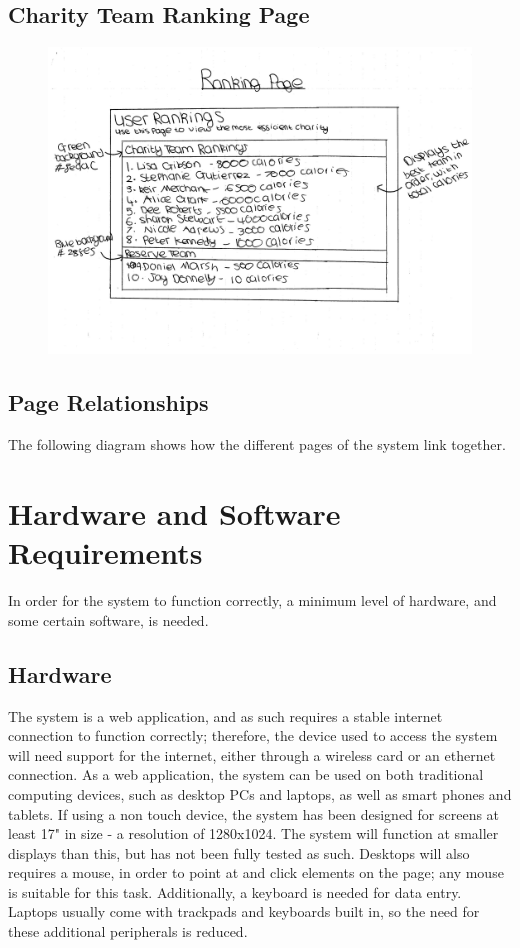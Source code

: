 \documentclass{article}[12pt,a4paper]
\begin{document}
\subsection{Charity Team Ranking Page}
\begin{figure}[h!]
  \includegraphics[scale=0.55]{design_ui/rankings}
\end{figure}
\clearpage

\subsection{Page Relationships}
The following diagram shows how the different pages of the system link together.


\section{Hardware and Software Requirements}
In order for the system to function correctly, a minimum level of hardware, and some certain software, is needed.

\subsection{Hardware}
The system is a web application, and as such requires a stable internet connection to function correctly; therefore, the device used to access the system will need support for the internet, either through a wireless card or an ethernet connection. As a web application, the system can be used on both traditional computing devices, such as desktop PCs and laptops, as well as smart phones and tablets. If using a non touch device, the system has been designed for screens at least 17" in size - a resolution of 1280x1024. The system will function at smaller displays than this, but has not been fully tested as such. Desktops will also requires a mouse, in order to point at and click elements on the page; any mouse is suitable for this task. Additionally, a keyboard is needed for data entry. Laptops usually come with trackpads and keyboards built in, so the need for these additional peripherals is reduced.
\end{document}
